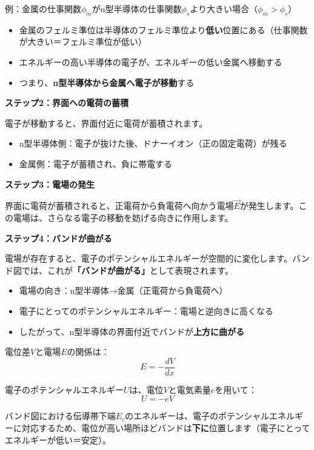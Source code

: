 例：金属の仕事関数$\phi_m$がn型半導体の仕事関数$\phi_s$より大きい場合（$\phi_m > \phi_s$）
\begin{itemize}
\item 金属のフェルミ準位は半導体のフェルミ準位より\textbf{低い}位置にある（仕事関数が大きい＝フェルミ準位が低い）
\item エネルギーの高い半導体の電子が、エネルギーの低い金属へ移動する
\item つまり、\textbf{n型半導体から金属へ電子が移動}する
\end{itemize}

\textbf{ステップ2：界面への電荷の蓄積}

電子が移動すると、界面付近に電荷が蓄積されます。
\begin{itemize}
\item n型半導体側：電子が抜けた後、ドナーイオン（正の固定電荷）が残る
\item 金属側：電子が蓄積され、負に帯電する
\end{itemize}

\textbf{ステップ3：電場の発生}

界面に電荷が蓄積されると、正電荷から負電荷へ向かう電場$\vec{E}$が発生します。この電場は、さらなる電子の移動を妨げる向きに作用します。

\textbf{ステップ4：バンドが曲がる}

電場が存在すると、電子のポテンシャルエネルギーが空間的に変化します。バンド図では、これが\textbf{「バンドが曲がる」}として表現されます。

\begin{itemize}
\item 電場の向き：n型半導体→金属（正電荷から負電荷へ）
\item 電子にとってのポテンシャルエネルギー：電場と逆向きに高くなる
\item したがって、n型半導体の界面付近でバンドが\textbf{上方に曲がる}
\end{itemize}

電位差$V$と電場$E$の関係は：
\begin{equation}
E = -\frac{dV}{dx}
\end{equation}

電子のポテンシャルエネルギー$U$は、電位$V$と電気素量$e$を用いて：
\begin{equation}
U = -eV
\end{equation}

バンド図における伝導帯下端$E_c$のエネルギーは、電子のポテンシャルエネルギーに対応するため、電位が高い場所ほどバンドは\textbf{下に}位置します（電子にとってエネルギーが低い＝安定）。

